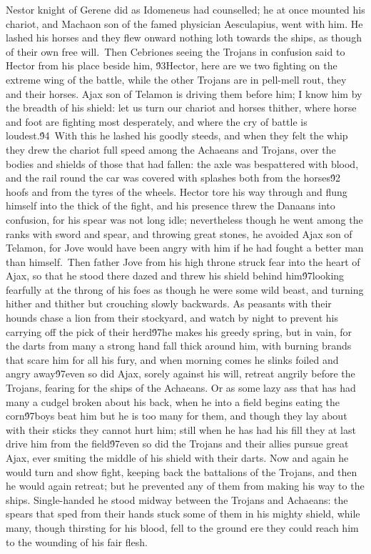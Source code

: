 {Nestor knight of Gerene did as Idomeneus had counselled; he at once mounted his chariot, and Machaon son of the famed physician Aesculapius, went with him. He lashed his horses and they flew onward nothing loth towards the ships, as though of their own free will.\
Then Cebriones seeing the Trojans in confusion said to Hector from his place beside him, \'93Hector, here are we two fighting on the extreme wing of the battle, while the other Trojans are in pell-mell rout, they and their horses. Ajax son of Telamon is driving them before him; I know him by the breadth of his shield: let us turn our chariot and horses thither, where horse and foot are fighting most desperately, and where the cry of battle is loudest.\'94\
With this he lashed his goodly steeds, and when they felt the whip they drew the chariot full speed among the Achaeans and Trojans, over the bodies and shields of those that had fallen: the axle was bespattered with blood, and the rail round the car was covered with splashes both from the horses\'92 hoofs and from the tyres of the wheels. Hector tore his way through and flung himself into the thick of the fight, and his presence threw the Danaans into confusion, for his spear was not long idle; nevertheless though he went among the ranks with sword and spear, and throwing great stones, he avoided Ajax son of Telamon, for Jove would have been angry with him if he had fought a better man than himself.\
Then father Jove from his high throne struck fear into the heart of Ajax, so that he stood there dazed and threw his shield behind him\'97looking fearfully at the throng of his foes as though he were some wild beast, and turning hither and thither but crouching slowly backwards. As peasants with their hounds chase a lion from their stockyard, and watch by night to prevent his carrying off the pick of their herd\'97he makes his greedy spring, but in vain, for the darts from many a strong hand fall thick around him, with burning brands that scare him for all his fury, and when morning comes he slinks foiled and angry away\'97even so did Ajax, sorely against his will, retreat angrily before the Trojans, fearing for the ships of the Achaeans. Or as some lazy ass that has had many a cudgel broken about his back, when he into a field begins eating the corn\'97boys beat him but he is too many for them, and though they lay about with their sticks they cannot hurt him; still when he has had his fill they at last drive him from the field\'97even so did the Trojans and their allies pursue great Ajax, ever smiting the middle of his shield with their darts. Now and again he would turn and show fight, keeping back the battalions of the Trojans, and then he would again retreat; but he prevented any of them from making his way to the ships. Single-handed he stood midway between the Trojans and Achaeans: the spears that sped from their hands stuck some of them in his mighty shield, while many, though thirsting for his blood, fell to the ground ere they could reach him to the wounding of his fair flesh.\
}
